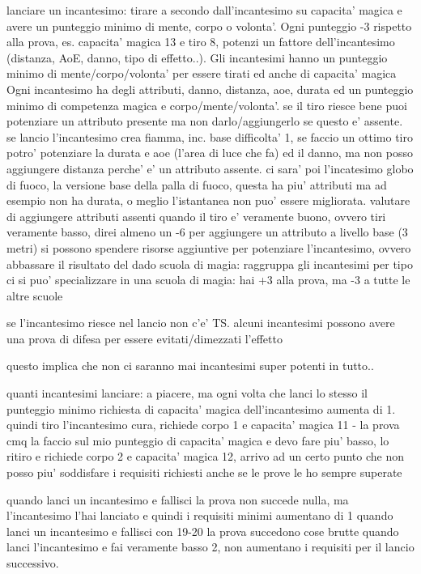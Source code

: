 \documentclass[12pt,a4paper,twoside,openany,twocolumn]{book}
\begin{document}
lanciare un incantesimo: tirare a secondo dall'incantesimo su capacita' magica e avere un punteggio minimo di  mente, corpo o volonta'.  Ogni punteggio -3 rispetto alla prova, es. capacita' magica 13 e tiro 8, potenzi un fattore dell'incantesimo (distanza, AoE, danno, tipo di effetto..). Gli incantesimi hanno un punteggio minimo di mente/corpo/volonta' per essere tirati ed anche di capacita' magica
Ogni incantesimo ha degli attributi, danno, distanza, aoe, durata ed un punteggio minimo di competenza magica e corpo/mente/volonta'. se il tiro riesce bene puoi potenziare un attributo presente ma non darlo/aggiungerlo se questo e' assente. se lancio l'incantesimo crea fiamma, inc. base difficolta' 1, se faccio un ottimo tiro potro' potenziare la durata e aoe (l'area di luce che fa) ed il danno, ma non posso aggiungere distanza perche' e' un attributo assente.
ci sara' poi l'incatesimo globo di fuoco, la versione base della palla di fuoco, questa ha piu' attributi ma ad esempio non ha durata, o meglio l'istantanea non puo' essere migliorata.
valutare di aggiungere attributi assenti quando il tiro e' veramente buono, ovvero tiri veramente basso, direi almeno un -6 per aggiungere un attributo a livello base (3 metri)
si possono spendere risorse aggiuntive per potenziare l'incantesimo, ovvero abbassare il risultato del dado
scuola di magia: raggruppa gli incantesimi per tipo
ci si puo' specializzare in una scuola di magia: hai +3 alla prova, ma -3 a tutte le altre scuole

se l'incantesimo riesce nel lancio non c'e' TS. alcuni incantesimi possono avere una prova di difesa per essere evitati/dimezzati l'effetto

questo implica che non ci saranno mai incantesimi super potenti in tutto..

quanti incantesimi lanciare:  a piacere, ma ogni volta che lanci lo stesso il punteggio minimo richiesta di capacita' magica dell'incantesimo aumenta di 1. quindi tiro l'incantesimo cura, richiede corpo 1 e capacita' magica 11 - la prova cmq la faccio sul mio punteggio di capacita' magica e devo fare piu' basso, lo ritiro e richiede corpo 2 e capacita' magica 12, arrivo ad un certo punto che non posso piu' soddisfare i requisiti richiesti anche se le prove le ho sempre superate

quando lanci un incantesimo e fallisci la prova non succede nulla, ma l'incantesimo l'hai lanciato e quindi i requisiti minimi aumentano di 1
quando lanci un incantesimo e fallisci con 19-20 la prova succedono cose  brutte
quando lanci l'incantesimo e fai veramente basso 2, non aumentano i requisiti per il lancio successivo.
\end{document}

